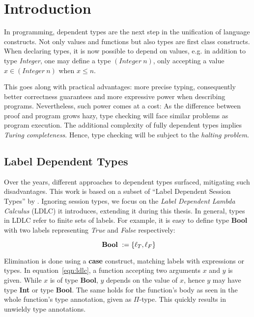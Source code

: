 \chapter{Introduction}\label{chap:introduction}

In programming, dependent types are the next step in the unification of language constructs. Not only values and functions but also types are first class constructs. When declaring types, it is now possible to depend on values, e.g. in addition to type \emph{Integer}, one may define a type $(Integer~n)$, only accepting a value $x \in (Integer~n)$ when $x \leq n$.

This goes along with practical advantages: more precise typing, consequently better correctness guarantees and more expressive power when describing programs. Nevertheless, such power comes at a cost: As the difference between proof and program grows hazy, type checking will face similar problems as program execution. The additional complexity of fully dependent types implies \emph{Turing completeness}. Hence, type checking will be subject to the \emph{halting problem}.

\section{Label Dependent Types}

Over the years, different approaches to dependent types surfaced, mitigating such disadvantages. This work is based on a subset of ``Label Dependent Session Types'' by \cite{thiemann2019}. Ignoring session types, we focus on the \emph{Label Dependent Lambda Calculus} (LDLC) it introduces, extending it during this thesis. In general, types in LDLC refer to finite sets of labels. For example, it is easy to define type \textbf{Bool} with two labels representing \emph{True} and \emph{False} respectively:

\begin{equation}\label{eqn:bool}
\text{ \textbf{Bool} }    := \{\ell_{T}, \ell_{F}\}
\end{equation}

Elimination is done using a \textbf{case} construct, matching labels with expressions or types. In equation~\ref{eqn:ldlc}, a function accepting two arguments $x$ and $y$ is given. While $x$ is of type \textbf{Bool}, $y$ depends on the value of $x$, hence $y$ may have type \textbf{Int} or type \textbf{Bool}. The same holds for the function's body as seen in the whole function's type annotation, given as $\Pi$-type. This quickly results in unwieldy type annotations.

